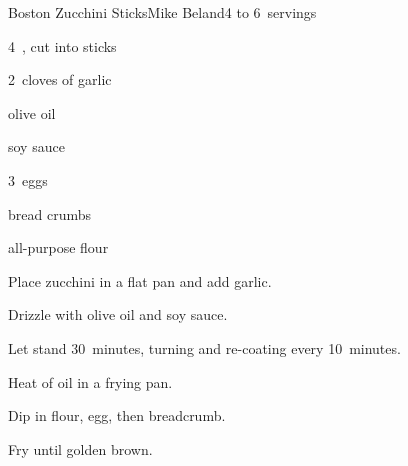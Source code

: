 \begin{recipe}{Boston Zucchini Sticks\UNTESTED}{Mike Beland}{4 to 6~servings}

\begin{ingredients}
\item 4~, cut into sticks
\item 2~cloves of garlic
\item olive oil
\item soy sauce
\item 3~eggs
\item bread crumbs
\item all-purpose flour
\end{ingredients}

\begin{directions}
\item Place zucchini in a flat pan and add garlic.
\item Drizzle with olive oil and soy sauce.
\item Let stand 30~minutes, turning and re-coating every 10~minutes.
\item Heat \inch{\quarter} of oil in a frying pan.
\item Dip in flour, egg, then breadcrumb.
\item Fry until golden brown.
\end{directions}

\end{recipe}
